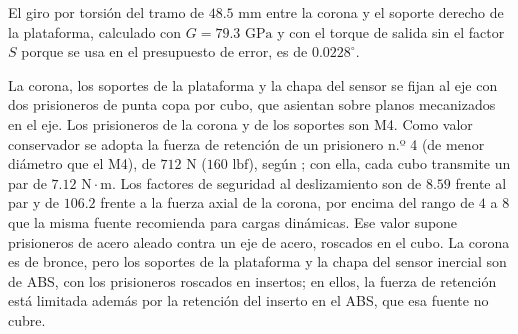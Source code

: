 \documentclass[../../General.tex]{subfiles}
\begin{document}
El giro por torsión del tramo de $48.5\text{ mm}$ entre la corona y el soporte derecho de la plataforma, calculado con $G = 79.3\text{ GPa}$ \citep{Shigley11th} y con el torque de salida sin el factor $S$ porque se usa en el presupuesto de error, es de $0.0228^\circ$.

La corona, los soportes de la plataforma y la chapa del sensor se fijan al eje con dos prisioneros de punta copa por cubo, que asientan sobre planos mecanizados en el eje. Los prisioneros de la corona y de los soportes son M4. Como valor conservador se adopta la fuerza de retención de un prisionero n.º 4 (de menor diámetro que el M4), de $712\text{ N}$ ($160\text{ lbf}$), según \citet{Shigley11th}; con ella, cada cubo transmite un par de $7.12\text{ N}\cdot\text{m}$. Los factores de seguridad al deslizamiento son de $8.59$ frente al par y de $106.2$ frente a la fuerza axial de la corona, por encima del rango de $4$ a $8$ que la misma fuente recomienda para cargas dinámicas. Ese valor supone prisioneros de acero aleado contra un eje de acero, roscados en el cubo. La corona es de bronce, pero los soportes de la plataforma y la chapa del sensor inercial son de ABS, con los prisioneros roscados en insertos; en ellos, la fuerza de retención está limitada además por la retención del inserto en el ABS, que esa fuente no cubre.
\end{document}

